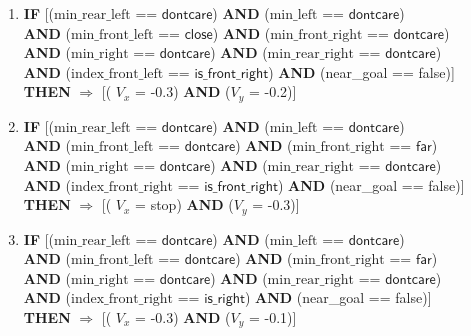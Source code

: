 \begin{enumerate}
	\item \textbf{IF} [($\text{min\_rear\_left}$ == $\textsf{dontcare}$) 
	\textbf{AND} ($\text{min\_left}$ == $\textsf{dontcare}$)\\
	\textbf{AND} ($\text{min\_front\_left}$ == $\textsf{close}$)
	\textbf{AND} ($\text{min\_front\_right}$ == $\textsf{dontcare}$)\\
	\textbf{AND} ($\text{min\_right}$ == $\textsf{dontcare}$) 
	\textbf{AND} ($\text{min\_rear\_right}$ == $\textsf{dontcare}$) \\
	\textbf{AND} ($\text{index\_front\_left}$ == $\textsf{is\_front\_right}$)
	\textbf{AND} (near\_goal == \textsf{false})]\\
	\textbf{THEN} $\Rightarrow$ [( $V_x$ = \textsf{-0.3}) \textbf{AND} ($V_y$ = \textsf{-0.2})]
	
	\item \textbf{IF} [($\text{min\_rear\_left}$ == $\textsf{dontcare}$) 
	\textbf{AND} ($\text{min\_left}$ == $\textsf{dontcare}$)\\
	\textbf{AND} ($\text{min\_front\_left}$ == $\textsf{dontcare}$)
	\textbf{AND} ($\text{min\_front\_right}$ == $\textsf{far}$)\\
	\textbf{AND} ($\text{min\_right}$ == $\textsf{dontcare}$) 
	\textbf{AND} ($\text{min\_rear\_right}$ == $\textsf{dontcare}$) \\
	\textbf{AND} ($\text{index\_front\_right}$ == $\textsf{is\_front\_right}$)
	\textbf{AND} (near\_goal == \textsf{false})]\\
	\textbf{THEN} $\Rightarrow$ [( $V_x$ = \textsf{stop}) \textbf{AND} ($V_y$ = \textsf{-0.3})]
	
	\newpage
	\item \textbf{IF} [($\text{min\_rear\_left}$ == $\textsf{dontcare}$) 
	\textbf{AND} ($\text{min\_left}$ == $\textsf{dontcare}$)\\
	\textbf{AND} ($\text{min\_front\_left}$ == $\textsf{dontcare}$)
	\textbf{AND} ($\text{min\_front\_right}$ == $\textsf{far}$)\\
	\textbf{AND} ($\text{min\_right}$ == $\textsf{dontcare}$) 
	\textbf{AND} ($\text{min\_rear\_right}$ == $\textsf{dontcare}$) \\
	\textbf{AND} ($\text{index\_front\_right}$ == $\textsf{is\_right}$)
	\textbf{AND} (near\_goal == \textsf{false})]\\
	\textbf{THEN} $\Rightarrow$ [( $V_x$ = \textsf{-0.3}) \textbf{AND} ($V_y$ = \textsf{-0.1})]
	

\end{enumerate}
